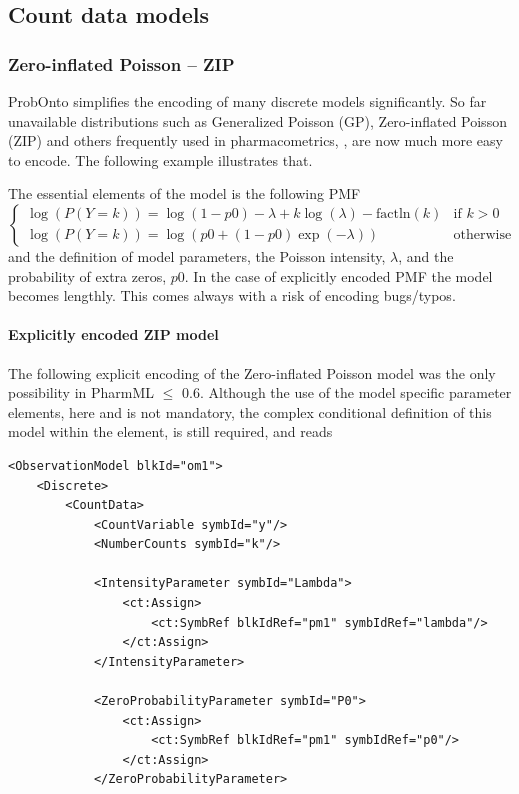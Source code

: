 {\subsection{Count data models}

\subsubsection{Zero-inflated Poisson -- ZIP}
ProbOnto simplifies the encoding of many discrete models significantly. 
So far unavailable distributions such as Generalized Poisson (GP), 
Zero-inflated Poisson (ZIP) and others frequently used in pharmacometrics,
\cite{Plan:2009fk, Troconiz:2009fv}, are now much more easy to encode. The following example illustrates that.

The essential elements of the model is the following PMF
\[
\begin{cases}
  \log(P(Y=k)) = \log(1-p0) - \lambda + k\log(\lambda) - \text{factln}(k) 	& \text{if } k > 0 \\
  \log(P(Y=k)) = \log(p0 + (1-p0)\exp(-\lambda)) 					& \text{otherwise}
\end{cases}
\]
and the definition of model parameters, the Poisson intensity, $\lambda$,
and the probability of extra zeros, $p0$. In the case of explicitly encoded PMF
the model becomes lengthly. This comes always with a risk of encoding bugs/typos.  

\paragraph{Explicitly encoded ZIP model}
The following explicit encoding of the Zero-inflated Poisson model was the only 
possibility in PharmML $\leq$ 0.6. Although the use of the model specific parameter 
elements, here  and  is not 
mandatory, the complex conditional definition of this model within the  
element, is still required, and reads
\lstset{language=XML}
\begin{lstlisting}
<ObservationModel blkId="om1">
    <Discrete>
        <CountData>
            <CountVariable symbId="y"/>
            <NumberCounts symbId="k"/>
            
            <IntensityParameter symbId="Lambda">
                <ct:Assign>
                    <ct:SymbRef blkIdRef="pm1" symbIdRef="lambda"/>
                </ct:Assign>
            </IntensityParameter>
            
            <ZeroProbabilityParameter symbId="P0">
                <ct:Assign>
                    <ct:SymbRef blkIdRef="pm1" symbIdRef="p0"/>
                </ct:Assign>
            </ZeroProbabilityParameter>
            

\end{lstlisting}}
